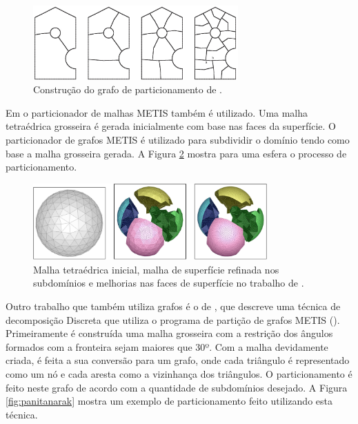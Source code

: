     \begin{figure}[htbp]
    	\centering
    	\includegraphics[width=0.7\textwidth]{fig/leonidas06.jpg}
    	\caption{Construção do grafo de particionamento de \cite{bib:Leonidas06}.}
    	\label{fig:leonidas06}
    \end{figure} 
    
    
    Em \cite{bib:Ito07} o particionador de malhas METIS também é utilizado. Uma malha tetraédrica grosseira é gerada inicialmente com base nas faces da superfície. O particionador de grafos METIS é utilizado para subdividir o domínio tendo como base a malha grosseira gerada. A Figura \ref{fig:ito} mostra para uma esfera o processo de particionamento.
    
    
    \begin{figure}[htbp]
    	\centering
    	\includegraphics[width=0.8\textwidth]{fig/ito.png}
    	\caption{Malha tetraédrica inicial, malha de superfície refinada nos subdomínios e melhorias nas faces de superfície no trabalho de \cite{bib:Ito07}.}
    	\label{fig:ito}
    \end{figure}
    
    Outro trabalho que também utiliza grafos é o de \cite{bib:PANITANARAK11}, que descreve uma técnica de decomposição Discreta que utiliza o programa de partição de grafos METIS (\cite{bib:Karypis98}). Primeiramente é construída uma malha grosseira com a restrição dos ângulos formados com a fronteira sejam maiores que 30º. Com a malha devidamente criada, é feita a sua conversão para um grafo, onde cada triângulo é representado como um nó e cada aresta como a vizinhança dos triângulos. O particionamento é feito neste grafo de acordo com a quantidade de subdomínios desejado. A Figura \ref{fig:panitanarak} mostra um exemplo de particionamento feito utilizando esta técnica.
    

